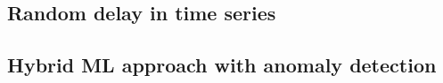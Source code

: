 \subsection{Random delay in time series}\label{subsec:bg-random-delay-in-time-series}

\subsection{Hybrid ML approach with anomaly detection}\label{subsec:bg-hybrid-ml-approach-with-anomaly-detection}






\clearpage